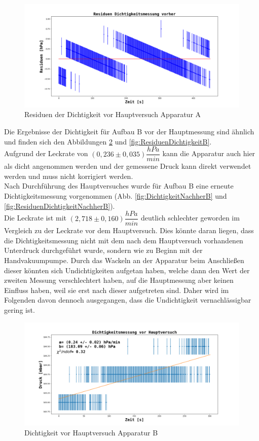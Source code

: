 \documentclass[12pt,a4paper]{article}
\begin{document}
\begin{figure}
\includegraphics[width=\linewidth]{Bilder/Residuen_Dichtigkeit_vorher_A.png}
\caption[Dichtigkeit vor Hauptversuch Apparatur A]{Residuen der Dichtigkeit vor Hauptversuch Apparatur A}
\label{fig:ResiduenDichtigkeitA}
\end{figure}

Die Ergebnisse der Dichtigkeit für Aufbau B vor der Hauptmessung sind ähnlich und finden sich den Abbildungen \ref{fig:DichtigkeitB} und \ref{fig:ResiduenDichtigkeitB}.\\
Aufgrund der Leckrate von $(0,236 \pm 0,035) \dfrac{hPa}{min}$ kann die Apparatur auch hier als dicht angenommen werden und der gemessene Druck kann direkt verwendet werden und muss nicht korrigiert werden.\\
Nach Durchführung des Hauptversuches wurde für Aufbau B eine erneute Dichtigkeitsmessung vorgenommen (Abb. \ref{fig:DichtigkeitNachherB} und \ref{fig:ResiduenDichtigkeitNachherB}).\\
Die Leckrate ist mit $(2,718 \pm 0,160) \dfrac{hPa}{min}$ deutlich schlechter geworden im Vergleich zu der Leckrate vor dem Hauptversuch. Dies könnte daran liegen, dass die Dichtigkeitsmessung nicht mit dem nach dem Hauptversuch vorhandenen Unterdruck durchgeführt wurde, sondern wie zu Beginn mit der Handvakuumpumpe. Durch das Wackeln an der Apparatur beim Anschließen dieser könnten sich Undichtigkeiten aufgetan haben, welche dann den Wert der zweiten Messung verschlechtert haben, auf die Hauptmessung aber keinen Einfluss haben, weil sie erst nach dieser aufgetreten sind. Daher wird im Folgenden davon dennoch ausgegangen, dass die Undichtigkeit vernachlässigbar gering ist.


\begin{figure}
\includegraphics[width=\linewidth]{Bilder/Dichtigkeit_vorher_B.png}
\caption[Dichtigkeit vor Hauptversuch Apparatur B]{Dichtigkeit vor Hauptversuch Apparatur B}
\label{fig:DichtigkeitB}
\end{figure}
\end{document}
